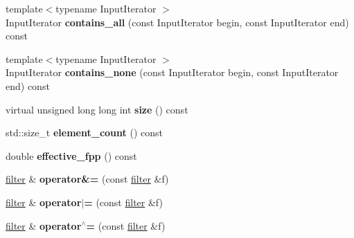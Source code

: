 \begin{DoxyCompactItemize}
\item 
\hypertarget{classstrtk_1_1bloom_1_1filter_a7071ffdaea6d5a166ac77e9ee3476941}{{\footnotesize template$<$typename Input\-Iterator $>$ }\\Input\-Iterator {\bfseries contains\-\_\-all} (const Input\-Iterator begin, const Input\-Iterator end) const }\label{classstrtk_1_1bloom_1_1filter_a7071ffdaea6d5a166ac77e9ee3476941}

\item 
\hypertarget{classstrtk_1_1bloom_1_1filter_a98bf8ecd23d94448df11371e921ffc1f}{{\footnotesize template$<$typename Input\-Iterator $>$ }\\Input\-Iterator {\bfseries contains\-\_\-none} (const Input\-Iterator begin, const Input\-Iterator end) const }\label{classstrtk_1_1bloom_1_1filter_a98bf8ecd23d94448df11371e921ffc1f}

\item 
\hypertarget{classstrtk_1_1bloom_1_1filter_a4b02261a990c573faf4f1e7e7159e0d7}{virtual unsigned long long int {\bfseries size} () const }\label{classstrtk_1_1bloom_1_1filter_a4b02261a990c573faf4f1e7e7159e0d7}

\item 
\hypertarget{classstrtk_1_1bloom_1_1filter_a6d956a30abb41d0cf2a0194f7d1f448f}{std\-::size\-\_\-t {\bfseries element\-\_\-count} () const }\label{classstrtk_1_1bloom_1_1filter_a6d956a30abb41d0cf2a0194f7d1f448f}

\item 
\hypertarget{classstrtk_1_1bloom_1_1filter_af05331a518553986056be1be03b1b3ed}{double {\bfseries effective\-\_\-fpp} () const }\label{classstrtk_1_1bloom_1_1filter_af05331a518553986056be1be03b1b3ed}

\item 
\hypertarget{classstrtk_1_1bloom_1_1filter_a1cca07541a5dcdd12ea7e25491503b92}{\hyperlink{classstrtk_1_1bloom_1_1filter}{filter} \& {\bfseries operator\&=} (const \hyperlink{classstrtk_1_1bloom_1_1filter}{filter} \&f)}\label{classstrtk_1_1bloom_1_1filter_a1cca07541a5dcdd12ea7e25491503b92}

\item 
\hypertarget{classstrtk_1_1bloom_1_1filter_a2e9540cf1eabeb0dd7a39348c8f34714}{\hyperlink{classstrtk_1_1bloom_1_1filter}{filter} \& {\bfseries operator$\vert$=} (const \hyperlink{classstrtk_1_1bloom_1_1filter}{filter} \&f)}\label{classstrtk_1_1bloom_1_1filter_a2e9540cf1eabeb0dd7a39348c8f34714}

\item 
\hypertarget{classstrtk_1_1bloom_1_1filter_afa2edc38e99e2be9facce335d7acb891}{\hyperlink{classstrtk_1_1bloom_1_1filter}{filter} \& {\bfseries operator$^\wedge$=} (const \hyperlink{classstrtk_1_1bloom_1_1filter}{filter} \&f)}\label{classstrtk_1_1bloom_1_1filter_afa2edc38e99e2be9facce335d7acb891}


\end{DoxyCompactItemize}
